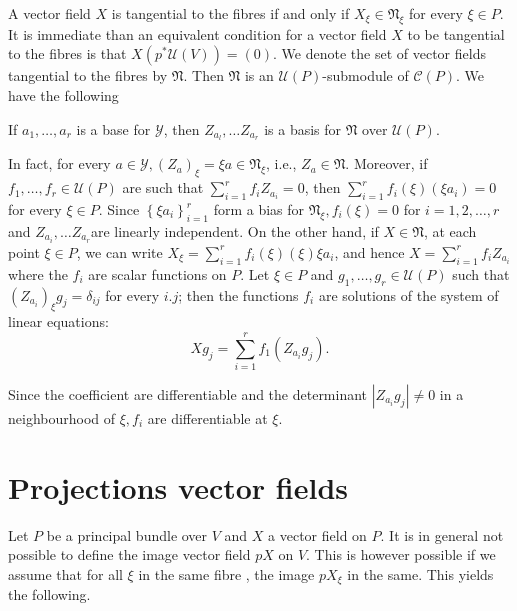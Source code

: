 A vector field $X$ is tangential to the fibres if and only if $X_\xi
\in \mathfrak{N}_\xi$ for every $\xi \in P$. It is immediate than an
equivalent condition for a vector field $X$ to be tangential to the
fibres is that $X(p^* \mathscr{U} (V)) = (0)$. We denote the set of
vector fields tangential to the fibres by $\mathfrak{N}$. Then
$\mathfrak{N}$ is an $\mathscr{U}(P)$-submodule  of $\mathscr{C}
(P)$. We have the following  

\begin{proposition}\label{chap2:sec8:prop4} %
  If $a_ 1 , \ldots , a_r$  is a base for $\mathscr{Y}$, then $Z_{a_l}
  , \ldots Z_{a_r}$ is a basis for $\mathfrak{N}$ over $\mathscr{U}
  (P)$.  
\end{proposition}

In fact, for every $a \in \mathscr{Y} , (Z_{a} )_{\xi} = \xi a \in
\mathfrak{N} _\xi $, i.e., $Z _a \in \mathfrak{N}$. Moreover, if $f_1
, \ldots , f_r \in \mathscr{U}(P)$ are such that $\sum\limits^r _{ i =
  1} f_i Z_{a _i} = 0 $, then $\sum\limits^r_{ i = 1 } f_i (\xi )
(\xi a_i) = 0$ for every $\xi \in P$. Since $\left\{ \xi a_i \right\}^r
_{ i = 1 }$ form a bias for $\mathfrak{N}_\xi , f_i (\xi) = 0 $ for
$i=1 , 2,  \ldots , r$ and $Z_{a_i}, \ldots Z_{a _r}$\pageoriginale are linearly
independent. On the other hand, if $X \in \mathfrak{N}$, at each point
$\xi \in P$, we can write $X_\xi = \sum \limits^r _{ i = 1} f_i (\xi )
(\xi ) \xi a_i$, and hence $X = \sum \limits^r_{ i = 1} f_i Z_{a _i}$
where the $f_i$ are scalar functions on $P$. Let $\xi \in P$ and $g_1,
\ldots , g_r \in \mathscr{U}(P)$ such that $(Z_{ a_i})_\xi g_j  =
\delta _{ij}$ for every $i. j$; then the functions $f_i$ are solutions
of the system of linear equations:  
$$
X g_j = \sum^{r}_{ i = 1}f_1 (Z_{a_i} g_j). 
$$

Since the coefficient are differentiable and the determinant $|
Z_{a_i} g_j| \neq 0$ in a neighbourhood of $\xi , f_i$ are differentiable
at $\xi$.  

\section{Projections vector fields}\label{chap2:sec9}  

Let $P$ be a principal bundle over $V$ and $X$ a vector field on
$P$. It is in general not possible to define the image vector field
$pX$ on $V$. This is however possible if we assume that for all $\xi$
in the same fibre , the image $pX_\xi$ in the same. This yields the
following.  

